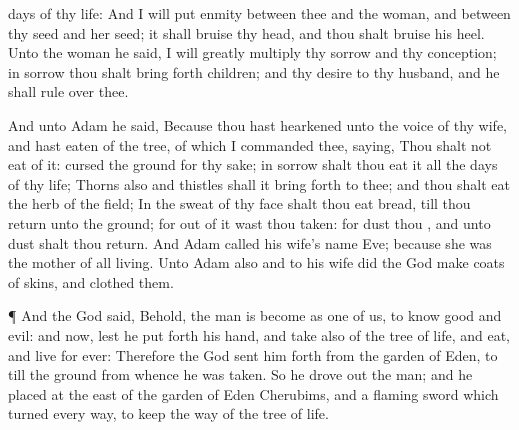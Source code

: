 {days of thy
life:
And I will
put
enmity between thee and the
woman, and between thy
seed and her
seed; it shall
bruise thy
head, and thou shalt
bruise his
heel.
Unto the
woman he
said, I will
greatly
multiply thy
sorrow and thy
conception; in
sorrow thou shalt bring
forth
children; and thy
desire
{} to thy
husband, and he shall
rule over thee.
\par }{\PP {}And unto
Adam he
said, Because thou hast
hearkened unto the
voice of thy
wife, and hast
eaten of the
tree, of
which I commanded
thee,
saying, Thou shalt not
eat of it:
cursed
{} the
ground for thy sake; in
sorrow shalt thou
eat
{} it
all the
days of thy
life;
Thorns
also and
thistles shall it bring
forth to thee; and thou shalt
eat the
herb of the
field;
In the
sweat of thy
face shalt thou
eat
bread,
till thou
return unto the
ground; for out of it wast thou
taken: for
dust
thou
{}, and unto
dust shalt thou
return.
And
Adam
called his
wife’s
name
Eve; because she was the
mother of all
living.
Unto
Adam also and to his
wife did the
{}
God
make
coats of
skins, and clothed
them.
\par }{\PP {}¶ And the
{}
God
said,
Behold, the
man is become as
one of us, to
know
good and
evil: and now, lest he put
forth his
hand, and
take also of the
tree of
life, and
eat, and
live for
ever:
Therefore the
{}
God sent him
forth from the
garden of
Eden, to
till the
ground from whence he was
taken.
So he drove
out the
man; and he
placed at the
east of the
garden of
Eden
Cherubims, and a
flaming
sword which turned every
way, to
keep the
way of the
tree of
life.

}
